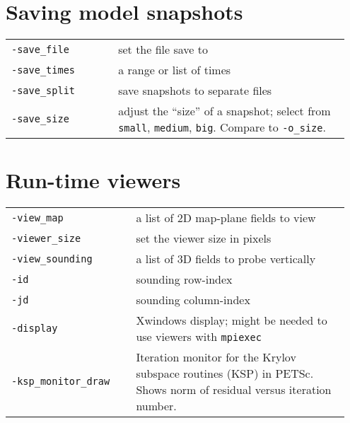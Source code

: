 \documentclass[landscape]{article}
\begin{document}
\begin{textblock}{15}

\section{Saving model snapshots}
\label{sec:snapshots}
\begin{tabular}{@{}p{0.3\linewidth}p{0.65\linewidth}@{}}
\texttt{-save_file} & set the file save to\\
\texttt{-save_times} & a range or list of times\\
\texttt{-save_split} & save snapshots to separate files\\
\texttt{-save_size} & adjust the ``size'' of a snapshot; select from
\texttt{small}, \texttt{medium}, \texttt{big}. Compare to \texttt{-o_size}.
\end{tabular}

\section{Run-time viewers}
\label{sec:run-time-viewers}

\begin{tabular}{@{}p{0.35\linewidth}p{0.6\linewidth}@{}}
\texttt{-view_map} & a list of 2D map-plane fields to view\\
\texttt{-viewer_size} & set the viewer size in pixels \\
\texttt{-view_sounding} & a list of 3D fields to probe vertically \\
\texttt{-id} & sounding row-index\\
\texttt{-jd} & sounding column-index\\
\texttt{-display} & Xwindows display; might be needed to use viewers with \texttt{mpiexec}\\
\texttt{-ksp_monitor_draw} & Iteration monitor for the Krylov subspace routines (KSP) 
in PETSc. Shows norm of residual versus iteration number.
\end{tabular}


\end{textblock}
\end{document}
